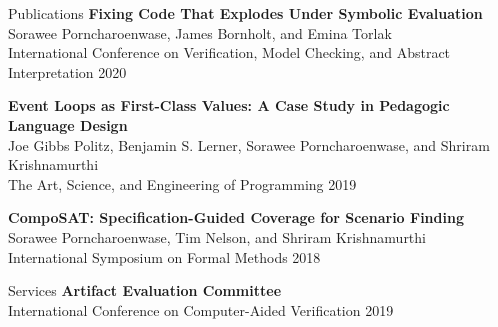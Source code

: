 \documentclass{resume} %
\begin{document}
\begin{rSection}{Publications}
  {\bf Fixing Code That Explodes Under Symbolic Evaluation}\\
  Sorawee Porncharoenwase, James Bornholt, and Emina Torlak\\
  International Conference on Verification, Model Checking, and Abstract
  Interpretation 2020

  {\bf Event Loops as First-Class Values: A Case Study in Pedagogic Language Design}\\
  Joe Gibbs Politz, Benjamin S. Lerner, Sorawee Porncharoenwase, and Shriram Krishnamurthi\\
  The Art, Science, and Engineering of Programming 2019

  {\bf CompoSAT: Specification-Guided Coverage for Scenario Finding}\\
  Sorawee Porncharoenwase, Tim Nelson, and Shriram Krishnamurthi\\
  International Symposium on Formal Methods 2018

\end{rSection}

\begin{rSection}{Services}
  {\bf Artifact Evaluation Committee} \\
  International Conference on Computer-Aided Verification 2019
  \end{rSection}
\end{document}
